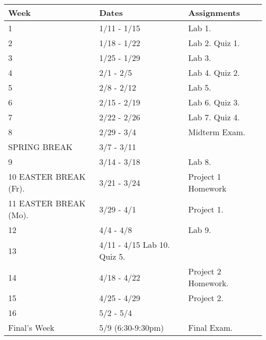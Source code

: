 \documentclass[10pt]{article}
\begin{document}
\begin{center}
\begin{tabular}{|l|l|l|}
\hline 
Week & Dates & Assignments \\
\hline
1 & 1/11 - 1/15 &  Lab 1.  \\
\hline
2 & 1/18 - 1/22 & Lab 2. Quiz 1. \\
\hline
3 & 1/25 - 1/29 & Lab 3.  \\
\hline
4 & 2/1 - 2/5 & Lab 4. Quiz 2.\\
\hline
5 & 2/8 - 2/12 & Lab 5.   \\
\hline
6 & 2/15 - 2/19 & Lab 6. Quiz 3. \\
\hline
7 & 2/22 - 2/26 & Lab 7.  Quiz 4.  \\
\hline
8 & 2/29 - 3/4 & Midterm Exam. \\
\hline 
SPRING BREAK & 3/7 - 3/11 & \\
\hline
9 & 3/14 - 3/18 & Lab 8.  \\
\hline
10 EASTER BREAK (Fr). & 3/21 - 3/24 & Project 1 Homework  \\
\hline
11 EASTER BREAK (Mo). & 3/29 - 4/1 & Project 1.  \\
\hline
12 & 4/4 - 4/8 & Lab 9.  \\
\hline
13 & 4/11 - 4/15 Lab 10. Quiz 5.   \\
\hline
14 & 4/18 - 4/22 & Project 2 Homework.  \\
\hline
15 & 4/25 - 4/29 & Project 2.  \\ 
\hline
16 & 5/2 - 5/4 &   \\
\hline
Final's Week & 5/9 (6:30-9:30pm) & Final Exam.   \\ 
\hline
\end{tabular}
\end{center}
\end{document}
